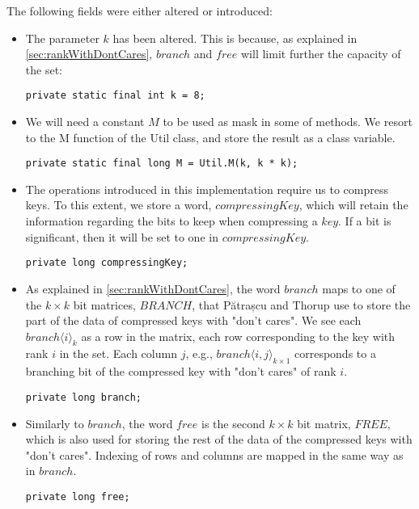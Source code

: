 The following fields were either altered or introduced:
\begin{itemize}
    \item
    The parameter $k$ has been altered. This is because, as explained in \ref{sec:rankWithDontCares}, $branch$ and $free$ will limit further the capacity of the set:
    \begin{lstlisting}
private static final int k = 8;
    \end{lstlisting}
    
    \item
    We will need a constant $M$ to be used as mask in some of methods. We resort to the {\ttfamily M} function of the {\ttfamily Util} class, and store the result as a class variable.
    \begin{lstlisting}
private static final long M = Util.M(k, k * k);
    \end{lstlisting}

    \item
    The operations introduced in this implementation require us to compress keys. To this extent, we store a word, $compressingKey$, which will retain the information regarding the bits to keep when compressing a $key$. If a bit is significant, then it will be set to one in $compressingKey$.
    \begin{lstlisting}
private long compressingKey;
    \end{lstlisting}

    \item
    As explained in \ref{sec:rankWithDontCares}, the word $branch$ maps to one of the $k \times k$ bit matrices, $BRANCH$, that Pătrașcu and Thorup use to store the part of the data of compressed keys with "don't cares".
    We see each $branch\langle i \rangle_k$ as a row in the matrix, each row corresponding to the key with rank $i$ in the set.
    Each column $j$, e.g., $branch\langle i, j\rangle_{k \times 1}$ corresponds to a branching bit of the compressed key with "don't cares" of rank $i$.
    \begin{lstlisting}
private long branch;
    \end{lstlisting}
    
    \item
    Similarly to $branch$, the word $free$ is the second $k \times k$ bit matrix, $FREE$, which is also used for storing the rest of the data of the compressed keys with "don't cares". Indexing of rows and columns are mapped in the same way as in $branch$.
    \begin{lstlisting}
private long free;
    \end{lstlisting}
\end{itemize}

